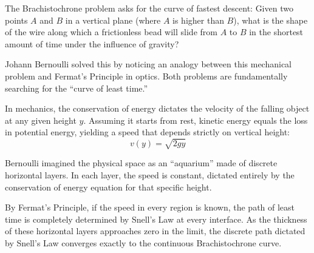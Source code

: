 \documentclass[../analysis1.tex]{subfiles}
\begin{document}
The Brachistochrone problem asks for the curve of fastest descent: Given two points $A$ and $B$ in a vertical plane (where $A$ is higher than $B$), what is the shape of the wire along which a frictionless bead will slide from $A$ to $B$ in the shortest amount of time under the influence of gravity?

\begin{remark}
    Johann Bernoulli solved this by noticing an analogy between this mechanical problem and Fermat's Principle in optics. Both problems are fundamentally searching for the ``curve of least time.''
    
    In mechanics, the conservation of energy dictates the velocity of the falling object at any given height $y$. Assuming it starts from rest, kinetic energy equals the loss in potential energy, yielding a speed that depends strictly on vertical height:
    \[ v(y) = \sqrt{2gy} \]
    
    Bernoulli imagined the physical space as an ``aquarium'' made of discrete horizontal layers. In each layer, the speed is constant, dictated entirely by the conservation of energy equation for that specific height. 
    
    By Fermat's Principle, if the speed in every region is known, the path of least time is completely determined by Snell's Law at every interface. As the thickness of these horizontal layers approaches zero in the limit, the discrete path dictated by Snell's Law converges exactly to the continuous Brachistochrone curve.
\end{remark}
\end{document}
